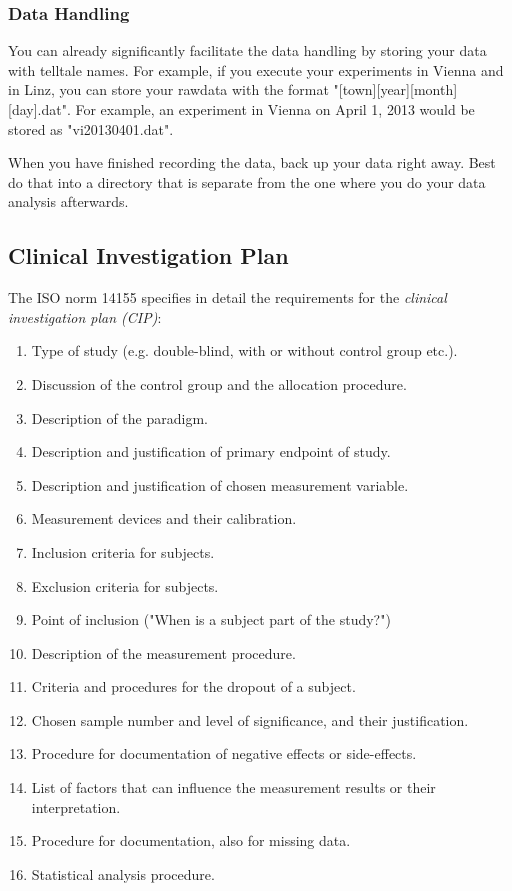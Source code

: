 \subsubsection{Data Handling}
You can already significantly facilitate the data handling by storing your data with telltale names. For example, if you execute your experiments in Vienna and in Linz, you can store your rawdata with the format "[town][year][month][day].dat". For example, an experiment in Vienna on April 1, 2013 would be stored as "vi20130401.dat".

When you have finished recording the data, back up your data right away. Best do that into a directory that is separate from the one where you do your data analysis afterwards.

\subsection{Clinical Investigation Plan}

The ISO norm 14155 specifies in detail the requirements for the \emph{clinical investigation plan (CIP)}:

\begin{enumerate}
  \item Type of study (e.g. double-blind, with or without control group etc.).
  \item Discussion of the control group and the allocation procedure.
  \item Description of the paradigm.
  \item Description and justification of primary endpoint of study.
  \item Description and justification of chosen measurement variable.
  \item Measurement devices and their calibration.
  \item Inclusion criteria for subjects.
  \item Exclusion criteria for subjects.
  \item Point of inclusion ("When is a subject part of the study?")
  \item Description of the measurement procedure.
  \item Criteria and procedures for the dropout of a subject.
  \item Chosen sample number and level of significance, and their justification.
  \item Procedure for documentation of negative effects or side-effects.
  \item List of factors that can influence the measurement results or their interpretation.
  \item Procedure for documentation, also for missing data.
  \item Statistical analysis procedure.
\end{enumerate}

